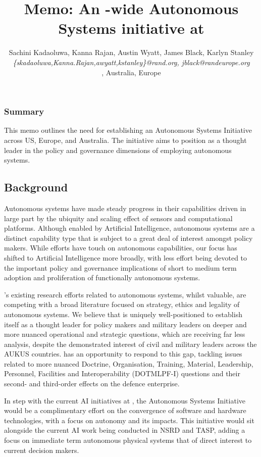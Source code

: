 \documentclass[11pt,letterpaper]{article}
\title{Memo: An \auke-wide Autonomous Systems initiative at \org}
\author{\textsf{\large{Sachini Kadaoluwa, Kanna Rajan, Austin Wyatt,
      James Black, Karlyn Stanley}}\\
  \emph{\{skadaoluwa,Kanna.Rajan,awyatt,kstanley\}@rand.org, jblack@randeurope.org}\\
  \orge, \org Australia, \org Europe
  }
\begin{document}
\maketitle{}

\subsubsection{Summary}

This memo outlines the need for establishing an Autonomous Systems
Initiative across \org US, Europe, and Australia. The initiative aims
to position \org as a thought leader in the policy and governance
dimensions of employing autonomous systems.

\subsection{Background}

Autonomous systems have made steady progress in their capabilities
driven in large part by the ubiquity and scaling effect of sensors and
computational platforms. Although enabled by Artificial Intelligence,
autonomous systems are a distinct capability type that is subject to a
great deal of interest amongst policy makers. While \org efforts have
touch on autonomous capabilities, our focus has shifted to Artificial
Intelligence more broadly, with less effort being devoted to the
important policy and governance implications of short to medium term
adoption and proliferation of functionally autonomous systems.

\orge’s existing research efforts related to autonomous systems, whilst
valuable, are competing with a broad literature focused on strategy,
ethics and legality of autonomous systems. We believe that \org is
uniquely well-positioned to establish itself as a thought leader for
policy makers and military leaders on deeper and more nuanced
operational and strategic questions, which are receiving far less
analysis, despite the demonstrated interest of civil and military
leaders across the AUKUS countries.  \org has an opportunity to
respond to this gap, tackling issues related to more nuanced Doctrine,
Organisation, Training, Material, Leadership, Personnel, Facilities
and Interoperability (DOTMLPF-I) questions and their second- and
third-order effects on the defence enterprise.

In step with the current AI initiatives at \orge, the Autonomous
Systems Initiative would be a complimentary effort on the convergence
of software and hardware technologies, with a focus on autonomy and
its impacts. This initiative would sit alongside the current AI work
being conducted in NSRD and TASP, adding a focus on immediate term
autonomous physical systems that of direct interest to current
decision makers.
\end{document}
